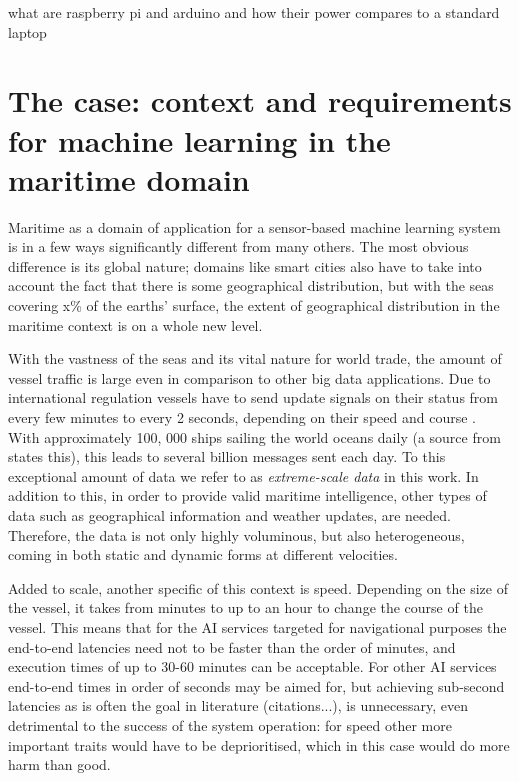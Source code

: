 what are raspberry pi and arduino and how their power compares to a standard laptop

\section{The case: context and requirements for machine learning in the maritime domain}

Maritime as a domain of application for a sensor-based machine learning system is in a few ways significantly different from many others. The most obvious difference is its global nature; domains like smart cities also have to take into account the fact that there is some geographical distribution, but with the seas covering x\% of the earths' surface, the extent of geographical distribution in the maritime context is on a whole new level.

With the vastness of the seas and its vital nature for world trade, the amount of vessel traffic is large even in comparison to other big data applications. Due to international regulation vessels have to send update signals on their status from every few minutes to every 2 seconds, depending on their speed and course \cite{maritimeinformatics}. With approximately 100, 000 ships sailing the world oceans daily (a source from \cite{maritimeinformatics} states this), this leads to several billion messages sent each day. To this exceptional amount of data we refer to as \textit{extreme-scale data} in this work. In addition to this, in order to provide valid maritime intelligence, other types of data such as geographical information and weather updates, are needed. Therefore, the data is not only highly voluminous, but also heterogeneous, coming in both static and dynamic forms at different velocities.

Added to scale, another specific of this context is speed. Depending on the size of the vessel, it takes from minutes to up to an hour to change the course of the vessel. This means that for the AI services targeted for navigational purposes the end-to-end latencies need not to be faster than the order of minutes, and execution times of up to 30-60 minutes can be acceptable. For other AI services end-to-end times in order of seconds may be aimed for, but achieving sub-second latencies as is often the goal in literature (citations...), is unnecessary, even detrimental to the success of the system operation: for speed other more important traits would have to be deprioritised, which in this case would do more harm than good.

